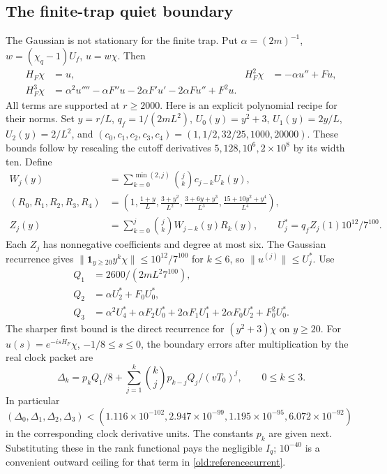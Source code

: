 \documentclass[11pt]{article}
\theoremstyle{definition}\newtheorem{definition}[theorem]{Definition}
\theoremstyle{remark}\newtheorem{remark}[theorem]{Remark}
\newcommand{\one}{\mathbf1}\newcommand{\R}{\mathbb R}\newcommand{\T}{\mathbb T}
\begin{document}
\subsection{The finite-trap quiet boundary}\label{old:quiet}
The Gaussian is not stationary for the finite trap. Put
$\alpha=(2m)^{-1}$, $w=(\chi_q-1)U_f$, $u=w\chi$.
Then
\begin{align*}
 H_F\chi&=u,&H_F^2\chi&=-\alpha u''+Fu,\\
 H_F^3\chi&=\alpha^2u''''-\alpha F''u-2\alpha F'u'
                               -2\alpha Fu''+F^2u.
\end{align*}
All terms are supported at $r\geq2000$. Here is an explicit polynomial
recipe for their norms. Set $y=r/L$, $q_f=1/(2mL^2)$,
$U_0(y)=y^2+3$, $U_1(y)=2y/L$, $U_2(y)=2/L^2$,
and $(c_0,c_1,c_2,c_3,c_4)=(1,1/2,32/25,1000,20000)$.
These bounds follow by rescaling the cutoff derivatives
$5,128,10^6,2\times10^8$ by its width ten.
Define
\begin{align*}
 W_j(y)&=\sum_{k=0}^{\min(2,j)}\binom jk c_{j-k}U_k(y),\\
 (R_0,R_1,R_2,R_3,R_4)&=\left(1,\frac{1+y}L,
 \frac{3+y^2}{L^2},\frac{3+6y+y^3}{L^3},
 \frac{15+10y^2+y^4}{L^4}\right),\\
 Z_j(y)&=\sum_{k=0}^j\binom jk W_{j-k}(y)R_k(y),\qquad
 U_j^*=q_f Z_j(1)10^{12}/7^{100}.
\end{align*}
Each $Z_j$ has nonnegative coefficients and degree at most six.
The Gaussian recurrence gives
$\|\one_{y\geq20}y^k\chi\|\leq10^{12}/7^{100}$ for $k\leq6$,
so $\|u^{(j)}\|\leq U_j^*$. Use
\begin{align*}
 Q_1&=2600/(2mL^2 7^{100}),\\
 Q_2&=\alpha U_2^*+F_0U_0^*,\\
 Q_3&=\alpha^2U_4^*+\alpha F_2U_0^*
                +2\alpha F_1U_1^*+2\alpha F_0U_2^*+F_0^2U_0^*.
\end{align*}
The sharper first bound is the direct recurrence for
$(y^2+3)\chi$ on $y\geq20$.
For $u(s)=e^{-isH_F}\chi$, $-1/8\leq s\leq0$, the boundary
errors after multiplication by the real clock packet are
\begin{equation}
 \Delta_k=p_kQ_1/8+
 \sum_{j=1}^k\binom kj p_{k-j}Q_j/(vT_0)^j,
 \qquad 0\leq k\leq3.\label{old:quietjets}
\end{equation}
In particular
$(\Delta_0,\Delta_1,\Delta_2,\Delta_3)<
(1.116\times10^{-102},2.947\times10^{-99},
1.195\times10^{-95},6.072\times10^{-92})$ in the corresponding
clock derivative units. The constants $p_k$ are given next.
Substituting these in the rank functional pays the negligible $I_q$;
$10^{-40}$ is a convenient outward ceiling for that term in
\eqref{old:referencecurrent}.
\end{document}
